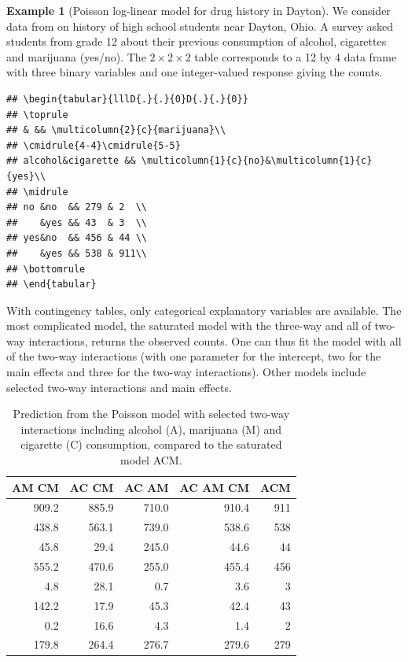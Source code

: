 \documentclass[
  11pt,
  letterpaper,
]{book}
\theoremstyle{definition}
\theoremstyle{definition}
\newtheorem{example}{Example}[chapter]
\theoremstyle{definition}
\theoremstyle{definition}
\theoremstyle{remark}
\begin{document}
\begin{example}[Poisson log-linear model for drug history in Dayton]
\protect\hypertarget{exm:poissonconting}{}{\label{exm:poissonconting} {} }We consider data from \citet{Agresti:2019} on history of high school students near Dayton, Ohio. A survey asked students from grade 12 about their previous consumption of alcohol, cigarettes and marijuana (yes/no). The \(2 \times 2 \times 2\) table corresponds to a 12 by 4 data frame with three binary variables and one integer-valued response giving the counts.
\end{example}

\begin{verbatim}
## \begin{tabular}{lllD{.}{.}{0}D{.}{.}{0}}
## \toprule
## & && \multicolumn{2}{c}{marijuana}\\
## \cmidrule{4-4}\cmidrule{5-5}
## alcohol&cigarette && \multicolumn{1}{c}{no}&\multicolumn{1}{c}{yes}\\
## \midrule
## no &no  && 279 & 2  \\
##    &yes && 43  & 3  \\
## yes&no  && 456 & 44 \\
##    &yes && 538 & 911\\
## \bottomrule
## \end{tabular}
\end{verbatim}

With contingency tables, only categorical explanatory variables are available. The most complicated model, the saturated model with the three-way and all of two-way interactions, returns the observed counts. One can thus fit the model with all of the two-way interactions (with one parameter for the intercept, two for the main effects and three for the two-way interactions). Other models include selected two-way interactions and main effects.

\begin{table}

\caption{\label{tab:daytonpred}Prediction from the Poisson model with selected two-way interactions including alcohol (A), marijuana (M) and cigarette (C) consumption, compared to the saturated model ACM.}
\centering
\begin{tabular}[t]{r|r|r|r|r}
\hline
AM CM & AC CM & AC AM & AC AM CM & ACM\\
\hline
909.2 & 885.9 & 710.0 & 910.4 & 911\\
\hline
438.8 & 563.1 & 739.0 & 538.6 & 538\\
\hline
45.8 & 29.4 & 245.0 & 44.6 & 44\\
\hline
555.2 & 470.6 & 255.0 & 455.4 & 456\\
\hline
4.8 & 28.1 & 0.7 & 3.6 & 3\\
\hline
142.2 & 17.9 & 45.3 & 42.4 & 43\\
\hline
0.2 & 16.6 & 4.3 & 1.4 & 2\\
\hline
179.8 & 264.4 & 276.7 & 279.6 & 279\\
\hline
\end{tabular}
\end{table}
\end{document}
